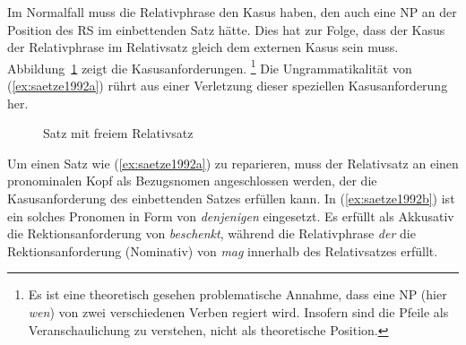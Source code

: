 
Im Normalfall muss die Relativphrase den Kasus haben, den auch eine NP an der Position des RS im einbettenden Satz hätte.
Dies hat zur Folge, dass der Kasus der Relativphrase im Relativsatz gleich dem externen Kasus sein muss.
Abbildung~\ref{fig:saetze1991b} zeigt die Kasusanforderungen.%
\footnote{Es ist eine theoretisch gesehen problematische Annahme, dass eine NP (hier \textit{wen}) von zwei verschiedenen Verben regiert wird.
Insofern sind die Pfeile als Veranschaulichung zu verstehen, nicht als theoretische Position.}
Die Ungrammatikalität von (\ref{ex:saetze1992a}) rührt aus einer Verletzung dieser speziellen Kasusanforderung her.

\begin{figure}[!htbp]
  \centering
  \caption{Satz mit freiem Relativsatz}
  \label{fig:saetze1991b}
\end{figure}

\begin{exe}
\end{exe}

Um einen Satz wie (\ref{ex:saetze1992a}) zu reparieren, muss der Relativsatz an einen pronominalen Kopf als Bezugsnomen angeschlossen werden, der die Kasusanforderung des einbettenden Satzes erfüllen kann.
In (\ref{ex:saetze1992b}) ist ein solches Pronomen in Form von \textit{denjenigen} eingesetzt.
Es erfüllt als Akkusativ die Rektionsanforderung von \textit{beschenkt}, während die Relativphrase \textit{der} die Rektionsanforderung (Nominativ) von \textit{mag} innerhalb des Relativsatzes erfüllt.


\begin{exe}
\end{exe}

